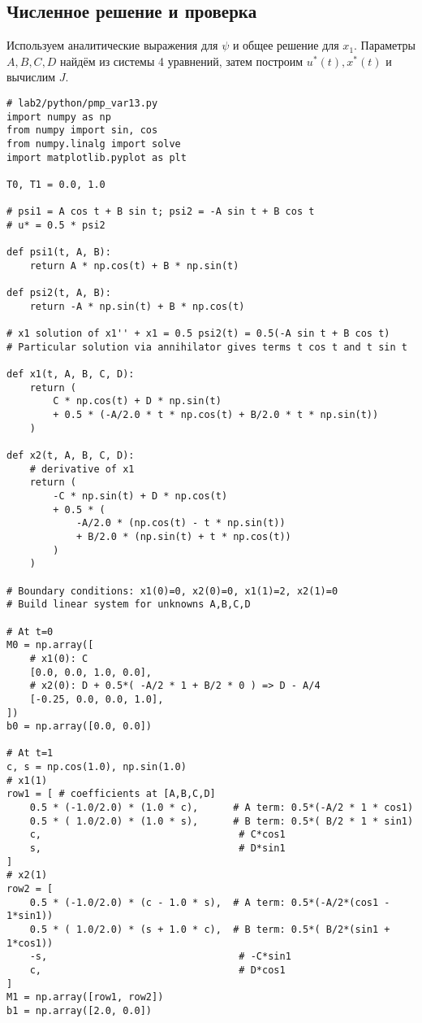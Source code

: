 \subsection{Численное решение и проверка}
Используем аналитические выражения для \(\psi\) и общее решение для \(x_1\). Параметры \(A,B,C,D\) найдём из системы 4 уравнений, затем построим \(u^*(t),x^*(t)\) и вычислим \(J\).

\begin{lstlisting}[caption={PMP: synthesis for variant 13, validation and plots},label={lst:pmp13}]
# lab2/python/pmp_var13.py
import numpy as np
from numpy import sin, cos
from numpy.linalg import solve
import matplotlib.pyplot as plt

T0, T1 = 0.0, 1.0

# psi1 = A cos t + B sin t; psi2 = -A sin t + B cos t
# u* = 0.5 * psi2

def psi1(t, A, B):
    return A * np.cos(t) + B * np.sin(t)

def psi2(t, A, B):
    return -A * np.sin(t) + B * np.cos(t)

# x1 solution of x1'' + x1 = 0.5 psi2(t) = 0.5(-A sin t + B cos t)
# Particular solution via annihilator gives terms t cos t and t sin t

def x1(t, A, B, C, D):
    return (
        C * np.cos(t) + D * np.sin(t)
        + 0.5 * (-A/2.0 * t * np.cos(t) + B/2.0 * t * np.sin(t))
    )

def x2(t, A, B, C, D):
    # derivative of x1
    return (
        -C * np.sin(t) + D * np.cos(t)
        + 0.5 * (
            -A/2.0 * (np.cos(t) - t * np.sin(t))
            + B/2.0 * (np.sin(t) + t * np.cos(t))
        )
    )

# Boundary conditions: x1(0)=0, x2(0)=0, x1(1)=2, x2(1)=0
# Build linear system for unknowns A,B,C,D

# At t=0
M0 = np.array([
    # x1(0): C
    [0.0, 0.0, 1.0, 0.0],
    # x2(0): D + 0.5*( -A/2 * 1 + B/2 * 0 ) => D - A/4
    [-0.25, 0.0, 0.0, 1.0],
])
b0 = np.array([0.0, 0.0])

# At t=1
c, s = np.cos(1.0), np.sin(1.0)
# x1(1)
row1 = [ # coefficients at [A,B,C,D]
    0.5 * (-1.0/2.0) * (1.0 * c),      # A term: 0.5*(-A/2 * 1 * cos1)
    0.5 * ( 1.0/2.0) * (1.0 * s),      # B term: 0.5*( B/2 * 1 * sin1)
    c,                                  # C*cos1
    s,                                  # D*sin1
]
# x2(1)
row2 = [
    0.5 * (-1.0/2.0) * (c - 1.0 * s),  # A term: 0.5*(-A/2*(cos1 - 1*sin1))
    0.5 * ( 1.0/2.0) * (s + 1.0 * c),  # B term: 0.5*( B/2*(sin1 + 1*cos1))
    -s,                                 # -C*sin1
    c,                                  # D*cos1
]
M1 = np.array([row1, row2])
b1 = np.array([2.0, 0.0])


\end{lstlisting}
